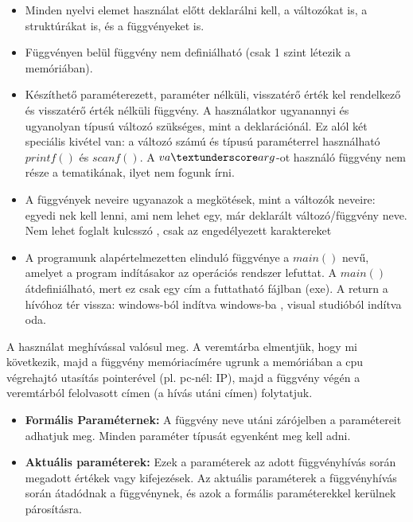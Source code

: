 \documentclass[11pt,a4paper]{article}
\begin{document}
            \begin{tcolorbox}[colback=blue!5!white,colframe=blue!50!black,title= 58. Ismertesse a függvények írásának és paraméterezésének nyelvi szabályait a C nyelvben!]
                \begin{itemize}
                    \item Minden nyelvi elemet használat előtt deklarálni kell, a változókat is, a struktúrákat is, és a függvényeket is.
                    \item Függvényen belül függvény nem definiálható (csak 1 szint létezik a memóriában).
                    \item Készíthető paraméterezett, paraméter nélküli, visszatérő érték kel rendelkező és visszatérő érték nélküli függvény. A használatkor ugyanannyi és ugyanolyan típusú változó szükséges, mint a deklarációnál. Ez alól két speciális kivétel van: a változó számú és típusú paraméterrel használható \(printf()\) és \(scanf()\). A \(va \textunderscore arg\)-ot használó függvény nem része a tematikának, ilyet nem fogunk írni.
                    \item A függvények neveire ugyanazok a megkötések, mint a változók neveire: egyedi nek kell lenni, ami nem lehet egy, már deklarált változó/függvény neve. Nem lehet foglalt kulcsszó , csak az engedélyezett karaktereket
                    \item A programunk alapértelmezetten elinduló függvénye a \(main()\) nevű, amelyet a program indításakor az operációs rendszer lefuttat. A \(main()\) átdefiniálható, mert ez csak egy cím a futtatható fájlban (exe). A return a hívóhoz tér vissza: windows-ból indítva windows-ba , visual studióból indítva oda.
                    
                \end{itemize}
                A használat meghívással valósul meg. A veremtárba elmentjük, hogy mi következik, majd a függvény memóriacímére ugrunk a memóriában a cpu végrehajtó utasítás pointerével (pl. pc-nél: IP), majd a függvény végén a veremtárból felolvasott címen (a hívás utáni címen) folytatjuk.
            \end{tcolorbox}

            \begin{tcolorbox}[colback=blue!5!white,colframe=blue!50!black,title= 59. Ismertesse a formális és aktuális paraméter fogalmát a C nyelv függvényeinél!]
                \begin{itemize}
                    \item \textbf{Formális Paraméternek:} A függvény neve utáni zárójelben a paramétereit adhatjuk meg. Minden paraméter típusát egyenként meg kell adni.
                    \item \textbf{Aktuális paraméterek:} Ezek a paraméterek az adott függvényhívás során megadott értékek vagy kifejezések. Az aktuális paraméterek a függvényhívás során átadódnak a függvénynek, és azok a formális paraméterekkel kerülnek párosításra.
                \end{itemize}
            \end{tcolorbox}
\end{document}
